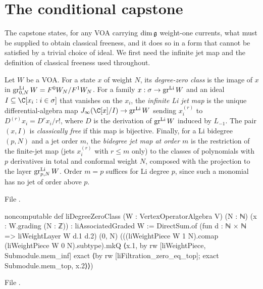 \section{The conditional capstone}\label{l24:sec:capstone}

The capstone states, for any VOA carrying $\dim\mathfrak g$ weight-one currents, what must be supplied to
obtain classical freeness, and it does so in a form that cannot be satisfied by a trivial choice of
ideal. We first need the infinite jet map and the definition of classical freeness used throughout.

\begin{definition}\label{l24:def:lpcf}
Let $W$ be a VOA. For a state $x$ of weight $N$, its \emph{degree-zero class} is the image of $x$ in
$\operatorname{gr}^{\mathrm{Li}}_{0,N}W=F^0W_N/F^1W_N$. For a family $x:\sigma\to\operatorname{gr}^{\mathrm{Li}} W$ and an ideal
$I\subseteq\C[x_i:i\in\sigma]$ that vanishes on the $x_i$, the \emph{infinite Li jet map} is the unique
differential-algebra map $\ltwentyfourJ(\C[x]/I)\to\ltwentyfourgr W$ sending $x_i^{(r)}$ to
$D^{(r)}x_i=D^rx_i/r!$, where $D$ is the derivation of $\operatorname{gr}^{\mathrm{Li}} W$ induced by $L_{-1}$. The pair
$(x,I)$ is \emph{classically free} if this map is bijective. Finally, for a Li bidegree $(p,N)$ and a jet order $m$, the
\emph{bidegree jet map at order $m$} is the restriction of the finite-jet map (jets $x_i^{(r)}$ with $r\le m$ only) to the
classes of polynomials with $p$ derivatives in total and conformal weight $N$, composed with the projection to the layer
$\operatorname{gr}^{\mathrm{Li}}_{p,N}W$. Order $m=p$ suffices for Li degree $p$, since such a monomial has no jet of order above $p$.
\end{definition}
\noindent File .
\begin{leancode}
noncomputable def liDegreeZeroClass (W : VertexOperatorAlgebra V) (N : ℕ)
    (x : W.grading (N : ℤ)) : liAssociatedGraded W :=
  DirectSum.of (fun d : ℕ × ℕ => liWeightLayer W d.1 d.2) (0, N)
    (((liWeightPiece W 1 N).comap (liWeightPiece W 0 N).subtype).mkQ
      ⟨x.1, by
        rw [liWeightPiece, Submodule.mem_inf]
        exact ⟨by rw [liFiltration_zero_eq_top]; exact Submodule.mem_top, x.2⟩⟩)
\end{leancode}
\noindent File .
